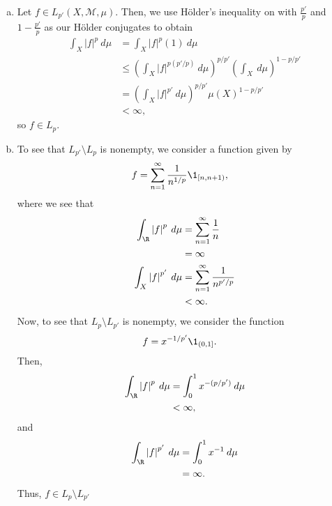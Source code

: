 \documentclass[10pt]{mypackage}
\begin{document}
\begin{enumerate}[(a)]
  \item Let $f\in L_{p'}\left( X,\mathcal{M},\mu \right)$. Then, we use Hölder's inequality on with $\frac{p'}{p}$ and $1-\frac{p'}{p}$ as our Hölder conjugates to obtain
    \begin{align*}
      \int_{X}^{} \left\vert f \right\vert^{p}\:d\mu &= \int_{X}^{} \left\vert f \right\vert^{p}\left( 1 \right)\:d\mu\\
                                                     &\leq \left( \int_{X}^{} \left\vert f \right\vert^{p\left( p'/p \right)}\:d\mu \right)^{p/p'} \left( \int_{X}^{} \:d\mu \right)^{1-p/p'}\\
                                                     &= \left( \int_{X}^{} \left\vert f \right\vert^{p'}\:d\mu \right)^{p/p'}\mu\left( X \right)^{1-p/p'}\\
                                                     &< \infty,
    \end{align*}
    so $f\in L_{p}$.
  \item To see that $L_{p'}\setminus L_{p}$ is nonempty, we consider a function given by
    \begin{align*}
      f &= \sum_{n=1}^{\infty} \frac{1}{n^{1/p}} \1_{[n,n+1)},
    \end{align*}
    where we see that
    \begin{align*}
      \int_{\R}^{} \left\vert f \right\vert^{p}\:d\mu &= \sum_{n=1}^{\infty}\frac{1}{n}\\
                                                      &= \infty\\
      \int_{X}^{} \left\vert f \right\vert^{p'}\:d\mu &= \sum_{n=1}^{\infty} \frac{1}{n^{p'/p}}\\
                                                      &< \infty.
    \end{align*}
    Now, to see that $L_{p}\setminus L_{p'}$ is nonempty, we consider the function
    \begin{align*}
      f &= x^{-1/p'} \1_{(0,1]}.
    \end{align*}
    Then,
    \begin{align*}
      \int_{\R}^{} \left\vert f \right\vert^{p}\:d\mu &= \int_{0}^{1} x^{-(p/p')}\:d\mu\\
                                                      &< \infty,
    \end{align*}
    and
    \begin{align*}
    \int_{\R}^{} \left\vert f \right\vert^{p'}\:d\mu &= \int_{0}^{1} x^{-1}\:d\mu\\
                                                     &= \infty.
    \end{align*}
    Thus, $f\in L_p\setminus L_{p'}$
\end{enumerate}
\end{document}
